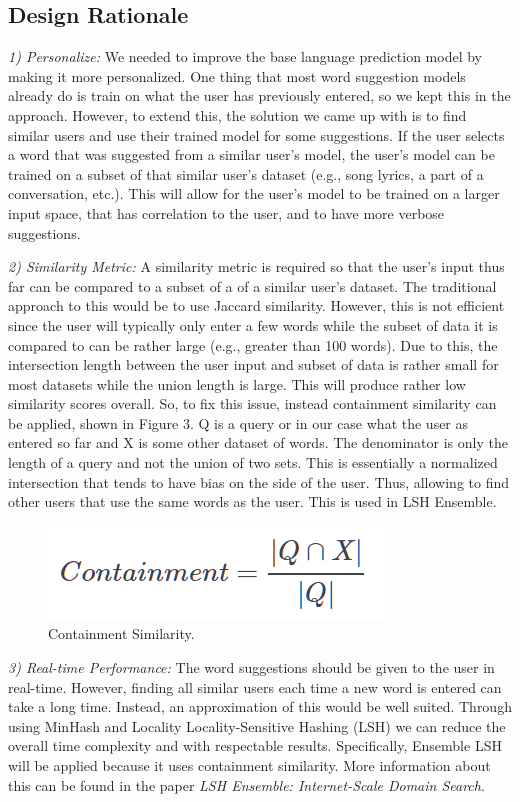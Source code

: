 \documentclass[sigconf]{acmart}
\begin{document}
\subsection{Design Rationale}
\textit{1) Personalize: }
We needed to improve the base language prediction model by making it more personalized. One thing that most word suggestion models already do is train on what the user has previously entered, so we kept this in the approach. However, to extend this, the solution we came up with is to find similar users and use their trained model for some suggestions. If the user selects a word that was suggested from a similar user’s model, the user’s model can be trained on a subset of that similar user’s dataset (e.g., song lyrics, a part of a conversation, etc.). This will allow for the user’s model to be trained on a larger input space, that has correlation to the user, and to have more verbose suggestions.

\textit{2) Similarity Metric: }
A similarity metric is required so that the user’s input thus far can be compared to a subset of a of a similar user’s dataset. The traditional approach to this would be to use Jaccard similarity. However, this is not efficient since the user will typically only enter a few words while the subset of data it is compared to can be rather large (e.g., greater than 100 words). Due to this, the intersection length between the user input and subset of data is rather small for most datasets while the union length is large. This will produce rather low similarity scores overall. So, to fix this issue, instead containment similarity can be applied, shown in Figure 3. Q is a query or in our case what the user as entered so far and X is some other dataset of words. The denominator is only the length of a query and not the union of two sets. This is essentially a normalized intersection that tends to have bias on the side of the user. Thus, allowing to find other users that use the same words as the user. This is used in LSH Ensemble.
\begin{figure}[h]
    \centering
    \includegraphics[width=0.5\linewidth]{figures/Containment_EQ.png}
    \caption{Containment Similarity.}
\end{figure}

\textit{3) Real-time Performance: }
The word suggestions should be given to the user in real-time. However, finding all similar users each time a new word is entered can take a long time. Instead, an approximation of this would be well suited. Through using MinHash and Locality Locality-Sensitive Hashing (LSH) we can reduce the overall time complexity and with respectable results. Specifically, Ensemble LSH will be applied because it uses containment similarity. More information about this can be found in the paper \textit{LSH Ensemble: Internet-Scale Domain Search}\cite{lshensemble}.
\end{document}
